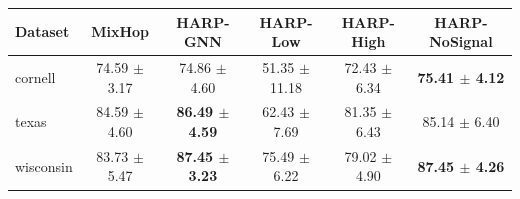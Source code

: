 \begin{tabular*}{0.94\linewidth}{@{\extracolsep{\fill}}lccccc@{}}
\toprule
Dataset & MixHop & HARP-GNN & HARP-Low & HARP-High & HARP-NoSignal \\
\midrule
cornell & 74.59 $\pm$ 3.17 & 74.86 $\pm$ 4.60 & 51.35 $\pm$ 11.18 & 72.43 $\pm$ 6.34 & \textbf{75.41 $\pm$ 4.12} \\
texas & 84.59 $\pm$ 4.60 & \textbf{86.49 $\pm$ 4.59} & 62.43 $\pm$ 7.69 & 81.35 $\pm$ 6.43 & 85.14 $\pm$ 6.40 \\
wisconsin & 83.73 $\pm$ 5.47 & \textbf{87.45 $\pm$ 3.23} & 75.49 $\pm$ 6.22 & 79.02 $\pm$ 4.90 & \textbf{87.45 $\pm$ 4.26} \\
\bottomrule
\end{tabular*}
